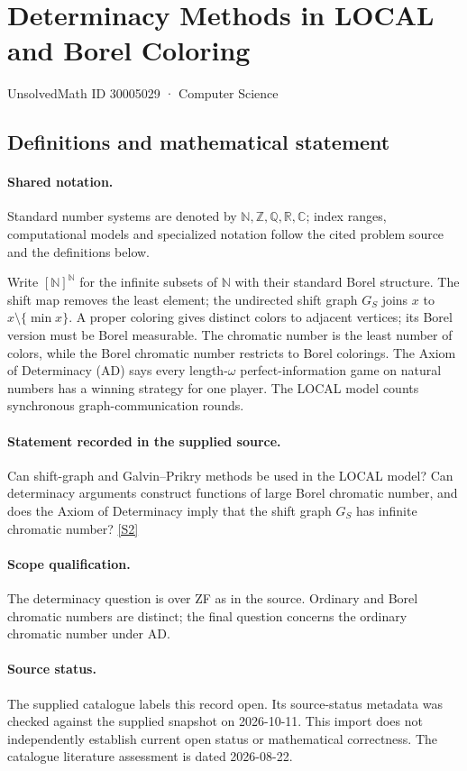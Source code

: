 \documentclass[11pt]{article}
\newcommand{\sref}[2]{\hyperlink{source:#1:#2}{[S#2]}}
\begin{document}
\setcounter{section}{30005028}
\section{Determinacy Methods in LOCAL and Borel Coloring}\label{30005029}
{\small\sffamily UnsolvedMath ID 30005029 · Computer Science}
\subsection{Definitions and mathematical statement}

\paragraph{Shared notation.}Standard number systems are denoted by $\mathbb N,\mathbb Z,\mathbb Q,\mathbb R,\mathbb C$; index ranges, computational models and specialized notation follow the cited problem source and the definitions below.


Write $[\mathbb N]^{\mathbb N}$ for the infinite subsets of $\mathbb N$ with their standard Borel structure. The shift map removes the least element; the undirected shift graph $G_S$ joins $x$ to $x\setminus\{\min x\}$. A proper coloring gives distinct colors to adjacent vertices; its Borel version must be Borel measurable. The chromatic number is the least number of colors, while the Borel chromatic number restricts to Borel colorings. The Axiom of Determinacy (AD) says every length-$\omega$ perfect-information game on natural numbers has a winning strategy for one player. The LOCAL model counts synchronous graph-communication rounds.
\paragraph{Statement recorded in the supplied source.}
Can shift-graph and Galvin–Prikry methods be used in the LOCAL model? Can determinacy arguments construct functions of large Borel chromatic number, and does the Axiom of Determinacy imply that the shift graph $G_S$ has infinite chromatic number? \sref{30005029}{2}
\paragraph{Scope qualification.}
The determinacy question is over ZF as in the source. Ordinary and Borel chromatic numbers are distinct; the final question concerns the ordinary chromatic number under AD.
\paragraph{Source status.}
The supplied catalogue labels this record open. Its source-status metadata was checked against the supplied snapshot on 2026-10-11. This import does not independently establish current open status or mathematical correctness. The catalogue literature assessment is dated 2026-08-22.
\end{document}
